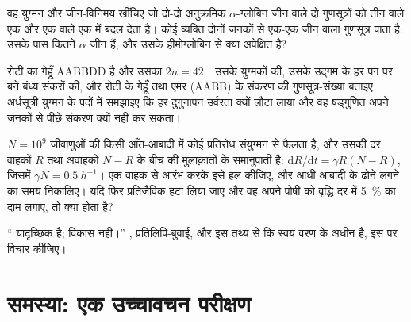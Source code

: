 \begin{exercise}[$\star\star$]\label{exo:b2:genome-diversification:9}
वह युग्मन और जीन-विनिमय खींचिए जो दो-दो अनुक्रमिक $\alpha$-ग्लोबिन जीन
वाले दो गुणसूत्रों को तीन वाले एक और एक वाले एक में बदल देता है। कोई
व्यक्ति दोनों जनकों से एक-एक जीन वाला गुणसूत्र पाता है: उसके पास कितने
$\alpha$ जीन हैं, और उसके हीमोग्लोबिन से क्या अपेक्षित है?
\end{exercise}

\begin{exercise}[$\star\star\star$]\label{exo:b2:genome-diversification:10}
रोटी का गेहूँ AABBDD है और उसका $2n = 42$। उसके युग्मकों की, उसके उद्गम
के हर पग पर बने बंध्य संकरों की, और रोटी के गेहूँ तथा एमर (AABB) के
संकरण की गुणसूत्र-संख्या बताइए। अर्धसूत्री युग्मन के पदों में समझाइए कि
हर दुगुनापन उर्वरता क्यों लौटा लाया और वह षड्गुणित अपने जनकों से पीछे
संकरण क्यों नहीं कर सकता।
\end{exercise}

\begin{exercise}[$\star\star\star$]\label{exo:b2:genome-diversification:11}
$N = 10^{9}$ जीवाणुओं की किसी आँत-आबादी में कोई प्रतिरोध 
संयुग्मन से फैलता है, और उसकी दर वाहकों $R$ तथा अवाहकों $N - R$ के बीच
की मुलाक़ातों के समानुपाती है: $\mathrm{d}R/\mathrm{d}t =
\gamma R (N - R)$, जिसमें $\gamma N = \qty{0.5}{h^{-1}}$। एक वाहक से
आरंभ करके इसे हल कीजिए, और आधी आबादी के  ढोने लगने का समय
निकालिए। यदि फिर प्रतिजैविक हटा लिया जाए और वह  अपने पोषी को
वृद्धि दर में \qty{5}{\%} का दाम लगाए, तो क्या होता है?
\end{exercise}

\begin{exercise}[$\star\star\star$]\label{exo:b2:genome-diversification:12}
`` यादृच्छिक है; विकास नहीं।'' ,
प्रतिलिपि-बुवाई, और इस तथ्य से कि  स्वयं वरण के अधीन है, इस
पर विचार कीजिए।
\end{exercise}

\section{समस्या: एक उच्चावचन परीक्षण}

